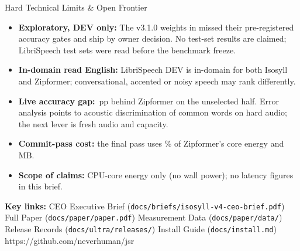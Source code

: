 \documentclass[letterpaper]{article}
\begin{document}
\begin{minipage}[t]{0.486\textwidth}
  \vspace{2.5pt}
  \begin{govbox}{Hard Technical Limits \& Open Frontier}
    \begin{itemize}[leftmargin=1.1em,itemsep=1.7pt,topsep=1.5pt]
      \item \textbf{Exploratory, DEV only:} The v3.1.0 weights in \releasever{} missed their pre-registered accuracy gates and ship by owner decision. No test-set results are claimed; LibriSpeech test sets were read before the benchmark freeze.
      \item \textbf{In-domain read English:} LibriSpeech DEV is in-domain for both Isosyll and Zipformer; conversational, accented or noisy speech may rank differently.
      \item \textbf{Live accuracy gap:} \CandLiveLmCDelta\,pp behind Zipformer on the unselected half. Error analysis points to acoustic discrimination of common words on hard audio; the next lever is fresh audio and capacity.
      \item \textbf{Commit-pass cost:} the final pass uses \VsEnergyPctTwo\% of Zipformer's core energy and \ColdRcTwoFinalRss\,MB.
      \item \textbf{Scope of claims:} CPU-core energy only (no wall power); no latency figures in this brief.
    \end{itemize}
  \end{govbox}
\end{minipage}

%
  {\textbf{Key links:} CEO Executive Brief (\texttt{docs/briefs/isosyll-v4-ceo-brief.pdf}) \;\textbar\; Full Paper (\texttt{docs/paper/paper.pdf}) \;\textbar\; Measurement Data (\texttt{docs/paper/data/}) \;\textbar\; Release Records (\texttt{docs/ultra/releases/}) \;\textbar\; Install Guide (\texttt{docs/install.md})}%
  {https://github.com/neverhuman/jsr}
\end{document}
